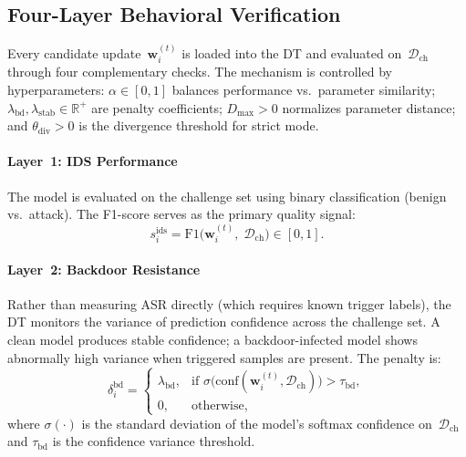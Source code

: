\documentclass[conference]{IEEEtran}
\begin{document}
\subsection{Four-Layer Behavioral Verification}\label{sec:fourlayer}

Every candidate update~$\mathbf{w}_i^{(t)}$ is loaded into the DT and evaluated on~$\mathcal{D}_{\text{ch}}$ through four complementary checks. The mechanism is controlled by hyperparameters: $\alpha \in [0,1]$ balances performance vs.\ parameter similarity; $\lambda_{\text{bd}}, \lambda_{\text{stab}} \in \mathbb{R}^+$ are penalty coefficients; $D_{\max} > 0$ normalizes parameter distance; and $\theta_{\text{div}} > 0$ is the divergence threshold for strict mode.

\paragraph{Layer~1: IDS Performance} The model is evaluated on the challenge set using binary classification (benign vs.\ attack). The F1-score serves as the primary quality signal:
\begin{equation}
    s_i^{\text{ids}} = \text{F1}\bigl(\mathbf{w}_i^{(t)},\; \mathcal{D}_{\text{ch}}\bigr) \in [0,1].
\label{eq:ids}
\end{equation}

\paragraph{Layer~2: Backdoor Resistance} Rather than measuring ASR directly (which requires known trigger labels), the DT monitors the variance of prediction confidence across the challenge set. A clean model produces stable confidence; a backdoor-infected model shows abnormally high variance when triggered samples are present. The penalty is:
\begin{equation}
    \delta_i^{\text{bd}} =
    \begin{cases}
        \lambda_{\text{bd}}, & \text{if } \sigma\bigl(\text{conf}(\mathbf{w}_i^{(t)}, \mathcal{D}_{\text{ch}})\bigr) > \tau_{\text{bd}}, \\
        0, & \text{otherwise},
    \end{cases}
\label{eq:bd}
\end{equation}
where $\sigma(\cdot)$ is the standard deviation of the model's softmax confidence on~$\mathcal{D}_{\text{ch}}$ and $\tau_{\text{bd}}$ is the confidence variance threshold.
\end{document}

